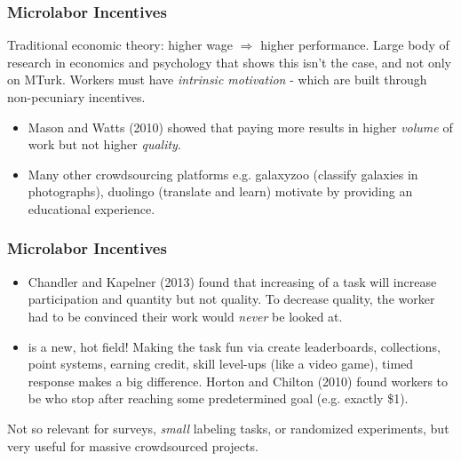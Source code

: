 \documentclass[slides]{beamer} %
\begin{document}
\begin{frame}\frametitle{Microlabor Incentives}

Traditional economic theory: higher wage $\Rightarrow$ higher performance.  \pause Large body of research in economics and psychology that shows this isn't the case, and not only on MTurk.  \pause Workers must have \textit{intrinsic motivation} - which are built through non-pecuniary incentives.

\begin{itemize}
\item Mason and Watts (2010) showed that paying more results in higher \textit{volume} of work but not higher \textit{quality}. \pause
\item Many other crowdsourcing platforms e.g. galaxyzoo (classify galaxies in photographs), duolingo (translate and learn) motivate by providing an educational experience.
\end{itemize}

\end{frame}

\begin{frame}\frametitle{Microlabor Incentives}

\begin{itemize}
\item Chandler and Kapelner (2013) found that increasing  of a task will increase participation and quantity but not quality. To decrease quality, the worker had to be convinced their work would \textit{never} be looked at. \pause
\item {} is a new, hot field! \pause Making the task fun via create leaderboards, collections, point systems, earning credit, skill level-ups (like a video game), timed response makes a big difference. Horton and Chilton (2010) found workers to be   who stop after reaching some predetermined goal (e.g. exactly \$1).  \pause
\end{itemize}

Not so relevant for surveys, \textit{small} labeling tasks, or randomized experiments, but very useful for massive crowdsourced projects.

\end{frame}
\end{document}
